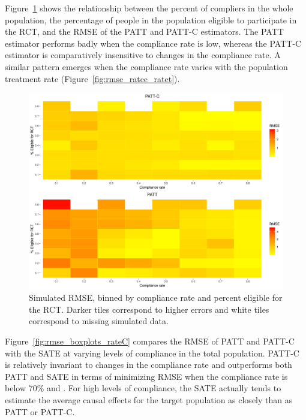 \documentclass[hidelinks,12pt]{article}
\begin{document}
{Figure~\ref{fig:rmse_ratec_rates} shows the relationship between the percent of compliers in the whole population, the percentage of people in the population eligible to participate in the RCT, and the RMSE of the PATT and PATT-C estimators. {\color{red}The PATT estimator performs badly when the compliance rate is low, whereas the PATT-C estimator is comparatively insensitive to changes in the compliance rate. A similar pattern emerges when the compliance rate varies with the population treatment rate (Figure~\ref{fig:rmse_ratec_ratet}).}
%

\begin{figure}[htbp]
	\begin{center}
		\includegraphics[width = 1\textwidth]{rmse_ratec_rates}
		\caption{Simulated RMSE, binned by compliance rate and percent eligible for the RCT. Darker tiles correspond to higher errors and white tiles correspond to missing simulated data.\label{fig:rmse_ratec_rates}}
	\end{center}
\end{figure}

{\color{red}Figure~\ref{fig:rmse_boxplots_rateC} compares the RMSE of PATT and PATT-C with the SATE at varying levels of compliance in the total population. PATT-C is relatively invariant to changes in the compliance rate and outperforms both PATT and SATE in terms of minimizing RMSE when the compliance rate is below 70\% and . For high levels of compliance, the SATE actually tends to estimate the average causal effects for the target population as closely than as PATT or PATT-C.  

}}
\end{document}
